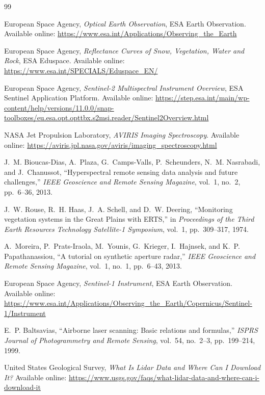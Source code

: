 \documentclass[
    11pt,
    a4paper,
    parskip=half,
    bibliography=totoc,
    numbers=noenddot
]{scrartcl}
\begin{document}
\begin{thebibliography}{99}

European Space Agency,
\textit{Optical Earth Observation},
ESA Earth Observation.
Available online:
\url{https://www.esa.int/Applications/Observing_the_Earth}

European Space Agency,
\textit{Reflectance Curves of Snow, Vegetation, Water and Rock},
ESA Eduspace.
Available online:
\url{https://www.esa.int/SPECIALS/Eduspace_EN/}

European Space Agency,
\textit{Sentinel-2 Multispectral Instrument Overview},
ESA Sentinel Application Platform.
Available online:
\url{https://step.esa.int/main/wp-content/help/versions/11.0.0/snap-toolboxes/eu.esa.opt.opttbx.s2msi.reader/Sentinel2Overview.html}

NASA Jet Propulsion Laboratory,
\textit{AVIRIS Imaging Spectroscopy}.
Available online:
\url{https://aviris.jpl.nasa.gov/aviris/imaging_spectroscopy.html}

J.~M. Bioucas-Dias, A.~Plaza, G.~Camps-Valls, P.~Scheunders,
N.~M. Nasrabadi, and J.~Chanussot,
``Hyperspectral remote sensing data analysis and future challenges,''
\textit{IEEE Geoscience and Remote Sensing Magazine},
vol.~1, no.~2, pp.~6--36, 2013.

J.~W. Rouse, R.~H. Haas, J.~A. Schell, and D.~W. Deering,
``Monitoring vegetation systems in the Great Plains with ERTS,''
in \textit{Proceedings of the Third Earth Resources Technology
Satellite-1 Symposium},
vol.~1, pp.~309--317, 1974.

A.~Moreira, P.~Prats-Iraola, M.~Younis, G.~Krieger, I.~Hajnsek,
and K.~P. Papathanassiou,
``A tutorial on synthetic aperture radar,''
\textit{IEEE Geoscience and Remote Sensing Magazine},
vol.~1, no.~1, pp.~6--43, 2013.

European Space Agency,
\textit{Sentinel-1 Instrument},
ESA Earth Observation.
Available online:
\url{https://www.esa.int/Applications/Observing_the_Earth/Copernicus/Sentinel-1/Instrument}

E.~P. Baltsavias,
``Airborne laser scanning: Basic relations and formulas,''
\textit{ISPRS Journal of Photogrammetry and Remote Sensing},
vol.~54, no.~2--3, pp.~199--214, 1999.

United States Geological Survey,
\textit{What Is Lidar Data and Where Can I Download It?}
Available online:
\url{https://www.usgs.gov/faqs/what-lidar-data-and-where-can-i-download-it}


\end{thebibliography}
\end{document}
